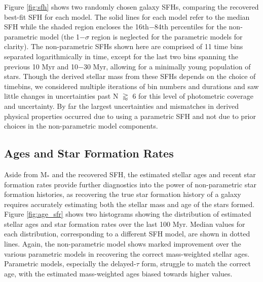 \documentclass[twocolumn]{aastex62}
\begin{document}
Figure \ref{fig:sfh} shows two randomly chosen galaxy SFHs, comparing the recovered best-fit SFH for each model. The solid lines for each model refer to the median SFH while the shaded region encloses the 16th$-$84th percentiles for the non-parametric model (the 1$-\sigma$ region is neglected for the parametric models for clarity). The non-parametric SFHs shown here are comprised of 11 time bins separated logarithmically in time, except for the last two bins spanning the previous 10 Myr and 10$-$30 Myr, allowing for a minimally young population of stars. Though the derived stellar mass from these SFHs depends on the choice of timebins, we considered multiple iterations of bin numbers and durations and saw little changes in uncertainties past N $\gtrapprox$ 6 for this level of photometric coverage and uncertainty. By far the largest uncertainties and mismatches in derived physical properties occurred due to using a parametric SFH and not due to prior choices in the non-parametric model components.  



\subsection{Ages and Star Formation Rates}\label{section:ages}

Aside from M$_*$ and the recovered SFH, the estimated stellar ages and recent star formation rates provide further diagnostics into the power of non-parametric star formation histories, as recovering the true star formation history of a galaxy requires accurately estimating both the stellar mass and age of the stars formed. Figure \ref{fig:age_sfr} shows two histograms showing the distribution of estimated stellar ages and star formation rates over the last 100 Myr. Median values for each distribution, corresponding to a different SFH model, are shown in dotted lines. Again, the non-parametric model shows marked improvement over the various parametric models in recovering the correct mass-weighted stellar ages. Parametric models, especially the delayed-$\tau$ form, struggle to match the correct age, with the estimated mass-weighted ages biased towards higher values.
\end{document}
